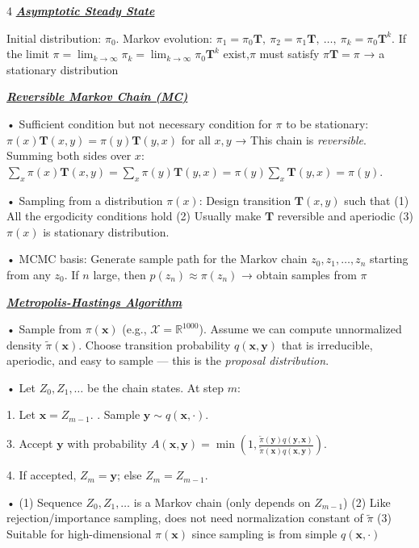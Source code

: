 \documentclass[10pt]{article}
\newcommand{\bulletPoint}[1]{\ul{\textit{\textbf{#1}}}}
\begin{document}
\begin{multicols*}{4}
\bulletPoint{Asymptotic Steady State}\quad

Initial distribution: $\pi_0$. 
Markov evolution: $\pi_1 = \pi_0 \mathbf{T}, \ \pi_2 = \pi_1 \mathbf{T}, \ \dots, \ \pi_k = \pi_0 \mathbf{T}^k$. 
If the limit $\pi = \lim_{k \to \infty} \pi_k = \lim_{k \to \infty} \pi_0 \mathbf{T}^k$ exist,$\pi$ must satisfy $\pi \mathbf{T} = \pi$ → a stationary distribution


\bulletPoint{Reversible Markov Chain (MC)}\quad

• Sufficient condition but not necessary condition for $\pi$ to be stationary: $\pi(x)\mathbf{T}(x,y) = \pi(y)\mathbf{T}(y,x)$ for all $x, y$  
→ This chain is \textit{reversible}. 
Summing both sides over $x$:  
$\sum_x \pi(x)\mathbf{T}(x,y) = \sum_x \pi(y)\mathbf{T}(y,x) = \pi(y)\sum_x \mathbf{T}(y,x) = \pi(y)$. 

• Sampling from a distribution $\pi(x)$: 
Design transition $\mathbf{T}(x,y)$ such that 
(1) All the ergodicity conditions hold  
(2) Usually make $\mathbf{T}$ reversible and aperiodic  
(3) $\pi(x)$ is stationary distribution. 

• MCMC basis:
Generate sample path for the Markov chain $z_0, z_1, \dots, z_n$ starting from any $z_0$.   
If $n$ large, then $p(z_n) \approx \pi(z_n)$  
→ obtain samples from $\pi$


\bulletPoint{Metropolis-Hastings Algorithm} \quad

• Sample from $\pi(\mathbf{x})$ (e.g., $\mathcal{X} = \mathbb{R}^{1000}$). 
Assume we can compute unnormalized density $\tilde{\pi}(\mathbf{x})$. 
Choose transition probability $q(\mathbf{x}, \mathbf{y})$ that is irreducible, aperiodic, and easy to sample — this is the \textit{proposal distribution}. 

• Let $Z_0, Z_1, \dots$ be the chain states. At step $m$:

1. Let $\mathbf{x} = Z_{m-1}$. . Sample $\mathbf{y} \sim q(\mathbf{x}, \cdot)$.   

3. Accept $\mathbf{y}$ with probability  
$A(\mathbf{x}, \mathbf{y}) = \min\left(1, \frac{\tilde{\pi}(\mathbf{y})q(\mathbf{y}, \mathbf{x})}{\tilde{\pi}(\mathbf{x})q(\mathbf{x}, \mathbf{y})} \right)$.   

4. If accepted, $Z_m = \mathbf{y}$; else $Z_m = Z_{m-1}$. 

• (1) Sequence $Z_0, Z_1, \dots$ is a Markov chain (only depends on $Z_{m-1}$)  
(2) Like rejection/importance sampling, does not need normalization constant of $\tilde{\pi}$  
(3) Suitable for high-dimensional $\pi(\mathbf{x})$ since sampling is from simple $q(\mathbf{x}, \cdot)$



\end{multicols*}
\end{document}
